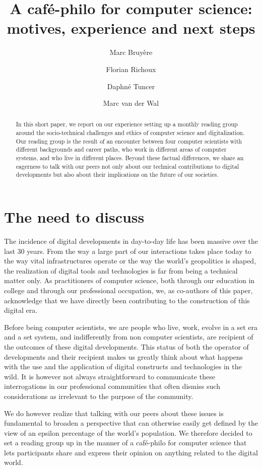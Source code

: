 \documentclass[conference]{IEEEtran}
\title{A café-philo for computer science:\\motives, experience and next steps}
\date{}
\author[1,3]{Marc Bruyère}
\author[2,3]{Florian Richoux}
\author[4]{Daphné Tuncer}
\author[5]{Marc van der Wal}
\affil[ ]{\it florian@richoux.fr}
\affil[1]{IIJ Research Lab, Japan}
\affil[2]{AIST, Japan}
\affil[3]{JFLI, CNRS, Japan}
\affil[4]{École des Ponts ParisTech, France}
\affil[5]{Afnic, France}
\begin{document}
\maketitle

\begin{abstract}
  In  this short  paper,  we report  on our  experience  setting up  a
  monthly  reading group  around  the  socio-technical challenges  and
  ethics of computer science and  digitalization. Our reading group is
  the result  of an  encounter between  four computer  scientists with
  different backgrounds and career paths,  who work in different areas
  of computer systems, and who  live in different places. Beyond these
  factual differences,  we share an  eagerness to talk with  our peers
  not only  about our technical contributions  to digital developments
  but also about their implications on the future of our societies.
\end{abstract}

\section{The need to discuss}

The  incidence of  digital developments  in day-to-day  life has  been
massive over  the last  30 years.  From the  way a  large part  of our
interactions  takes  place  today  to the  way  vital  infrastructures
operate or the way the  world’s geopolitics is shaped, the realization
of digital tools and technologies is far from being a technical matter
only. As practitioners of computer science, both through our education
in college and through our  professional occupation, we, as co-authors
of this paper, acknowledge that  we have directly been contributing to
the construction of this digital era.

Before being computer scientists, we are people who live, work, evolve
in a  set era and  a set system,  and indifferently from  non computer
scientists,   are  recipient   of  the   outcomes  of   these  digital
developments. This  status of  both the  operator of  developments and
their recipient makes us greatly think about what happens with the use
and  the application  of digital  constructs and  technologies in  the
wild. It  is however not  always straightforward to  communicate these
interrogations in our professional communities that often dismiss such
considerations as irrelevant to the purpose of the community.

We do however  realize that talking with our peers  about these issues
is fundamental to broaden a  perspective that can otherwise easily get
defined  by  the  view  of   an  epsilon  percentage  of  the  world’s
population. We  therefore decided  to set  a reading  group up  in the
manner of  a café-philo  for computer  science that  lets participants
share and  express their  opinion on anything  related to  the digital
world.
\end{document}
